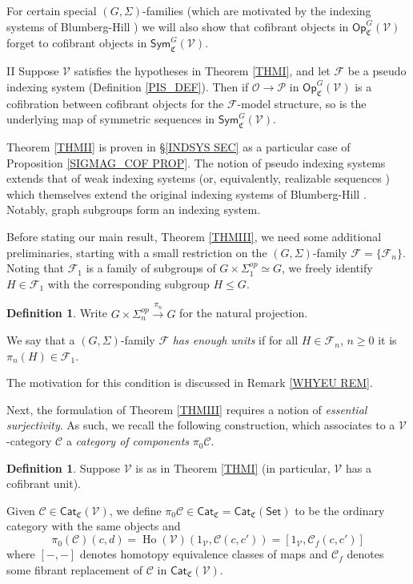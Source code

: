 \documentclass[a4paper,10pt
,draft
]{article}%
\numberwithin{equation}{section}
\numberwithin{figure}{section}
\theoremstyle{definition} %
\newtheorem{definition}[equation]{Definition}%
\newcommand{\Sym}{\ensuremath{\mathsf{Sym}}}%
\newcommand{\Cat}{\mathsf{Cat}}
\newcommand{\Op}{\mathsf{Op}}%
\DeclareMathOperator{\Ho}{Ho}
\newcommand{\F}{\ensuremath{\mathcal F}}
\newcommand{\V}{\ensuremath{\mathcal V}}
\renewcommand{\O}{\ensuremath{\mathcal O}}
\newcommand{\1}{\ensuremath{\mathbbm 1}}%
\begin{document}
For certain special $(G,\Sigma)$-families
(which are motivated by the indexing systems of Blumberg-Hill \cite{BH15})
we will also show that cofibrant objects in 
$\Op^G_{\mathfrak C}(\V)$
forget to cofibrant objects in 
$\mathsf{Sym}^G_{\mathfrak C}(\V)$.


\begin{customthm}{II}\label{THMII}
	Suppose $\V$ satisfies the hypotheses in Theorem \ref{THMI},
	and let $\F$ be a pseudo indexing system (Definition \ref{PIS_DEF}).
	Then if $\O \to \mathcal{P}$ in $\Op^G_{\mathfrak{C}}(\V)$ is a cofibration between cofibrant objects for the $\F$-model structure,
	so is the underlying
	map of symmetric sequences in $\Sym^G_{\mathfrak{C}}(\V)$.
\end{customthm}


Theorem \ref{THMII} is proven in \S \ref{INDSYS SEC}
as a particular case of Proposition \ref{SIGMAG_COF PROP}.
The notion of pseudo indexing systems
extends that of weak indexing systems \cite[Defn. 4.49]{BP_geo}
(or, equivalently, realizable sequences \cite[Defn. 4.6]{GW18})
which themselves extend the original 
indexing systems of Blumberg-Hill \cite{BH15}.
Notably, graph subgroups form an indexing system.


\vskip 10pt


Before stating our main result, Theorem \ref{THMIII},
we need some additional preliminaries,
starting with a small restriction on the 
$(G,\Sigma)$-family $\mathcal{F} = \{\F_n\}$.
Noting that $\F_1$ is a family of subgroups of 
$G \times \Sigma_1^{op} \simeq G$,
we freely identify 
$H \in \F_1$ with the corresponding subgroup $H \leq G$.

\begin{definition}\label{FAMRESUNI DEF}
	Write $G \times \Sigma_n^{op} \xrightarrow{\pi_n} 
	G$
	for the natural projection.
	
	We say that a $(G,\Sigma)$-family $\F$ 
	\emph{has enough units}
	if for all $H \in \F_n$, $n\geq 0$
	it is $\pi_n(H) \in \F_1$.
\end{definition}

The motivation for this condition is discussed in Remark \ref{WHYEU REM}.


Next, the formulation of Theorem \ref{THMIII} requires a notion of 
\emph{essential surjectivity}.
As such, we recall the following construction, 
which associates to a $\V$-category $\mathcal{C}$
a \emph{category of components} $\pi_0 \mathcal{C}$.




\begin{definition}
	Suppose $\V$ is as in Theorem \ref{THMI}
	(in particular, $\V$ has a cofibrant unit).

	Given $\mathcal C \in \Cat_{\mathfrak{C}}(\V)$, we define 
	$\pi_0 \mathcal C \in \Cat_{\mathfrak{C}} = \Cat_{\mathfrak{C}}(\mathsf{Set})$ 
	to be the ordinary category with the same objects and
\[
	\pi_0(\mathcal{C})(c,d)=
	\Ho(\V)(1_\V, \mathcal C(c,c'))=
	[1_\V, \mathcal{C}_f(c,c')]
\]
where $[-,-]$ denotes homotopy equivalence classes of maps
and $\mathcal{C}_f$ denotes some fibrant replacement of
$\mathcal C$ in $\Cat_{\mathfrak{C}}(\V)$.
\end{definition}
\end{document}
